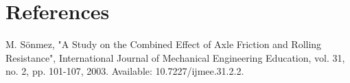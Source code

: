 \documentclass[journal,10pt]{IEEEtran}
\begin{document}
\section{References}

\cite{IEEEabrv,IEEEexample}






\begin{thebibliography}{}
    M. Sönmez, "A Study on the Combined Effect of Axle Friction and Rolling Resistance", International Journal of Mechanical Engineering Education, vol. 31, no. 2, pp. 101-107, 2003. Available: 10.7227/ijmee.31.2.2.
\end{thebibliography}
\end{document}

